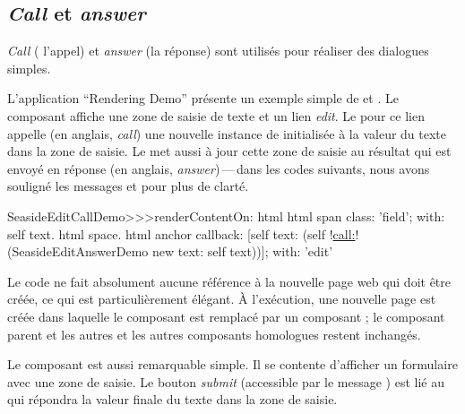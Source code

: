 \documentclass[a4paper,10pt,twoside]{book}
\begin{document}
\subsection{\emph{Call} et \emph{answer}}

\emph{Call} (\cad{} l'appel) et \emph{answer} (\cad la réponse) sont utilisés
pour réaliser des dialogues simples.

L'application ``Rendering Demo'' présente un exemple simple de
 et .
Le composant  affiche une zone de saisie de
texte et un lien \emph{edit}.
Le \callback pour ce lien appelle (en anglais, \emph{call}) une nouvelle instance de
 initialisée à la valeur du texte dans la
zone de saisie.
Le \callback met aussi à jour cette zone de saisie au résultat qui est
envoyé en réponse (en anglais, \emph{answer})\,---\,dans les codes
suivants, nous avons souligné les messages  et
 pour plus de clarté. %

\begin{code}{}
SeasideEditCallDemo>>>renderContentOn: html
	html span
		class: 'field';
		with: self text.
	html space.
	html anchor
		callback: [self text: (self !\underline{call:}! (SeasideEditAnswerDemo new text: self text))];
		with: 'edit'
\end{code}{}

Le code ne fait absolument aucune référence à la nouvelle page web qui
doit être créée, ce qui est particulièrement élégant.
À l'exécution, une nouvelle page est créée dans laquelle le composant
 est remplacé par un composant
; le composant parent et les autres et les
autres composants homologues restent inchangés.


Le composant  est aussi remarquable simple.
Il se contente d'afficher un formulaire avec une zone de saisie.
Le bouton \emph{submit} 
(\brush accessible par le message )
est lié au \callback qui répondra la valeur finale du texte dans la
zone de saisie.
\end{document}
